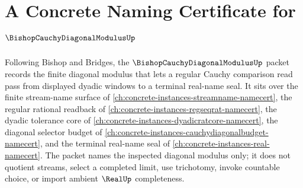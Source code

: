 \chapter{A Concrete Naming Certificate for $\BishopCauchyDiagonalModulusUp$}
\label{ch:concrete-instances-bishop-cauchy-diagonal-modulus-namecert}

Following Bishop and Bridges, the $\BishopCauchyDiagonalModulusUp$ packet records the finite diagonal modulus that lets a regular Cauchy comparison read pass from displayed dyadic windows to a terminal real-name seal. It sits over the finite stream-name surface of \autoref{ch:concrete-instances-streamname-namecert}, the regular rational readback of \autoref{ch:concrete-instances-regseqrat-namecert}, the dyadic tolerance core of \autoref{ch:concrete-instances-dyadicratcore-namecert}, the diagonal selector budget of \autoref{ch:concrete-instances-cauchydiagonalbudget-namecert}, and the terminal real-name seal of \autoref{ch:concrete-instances-real-namecert}. The packet names the inspected diagonal modulus only; it does not quotient streams, select a completed limit, use trichotomy, invoke countable choice, or import ambient $\RealUp$ completeness.


